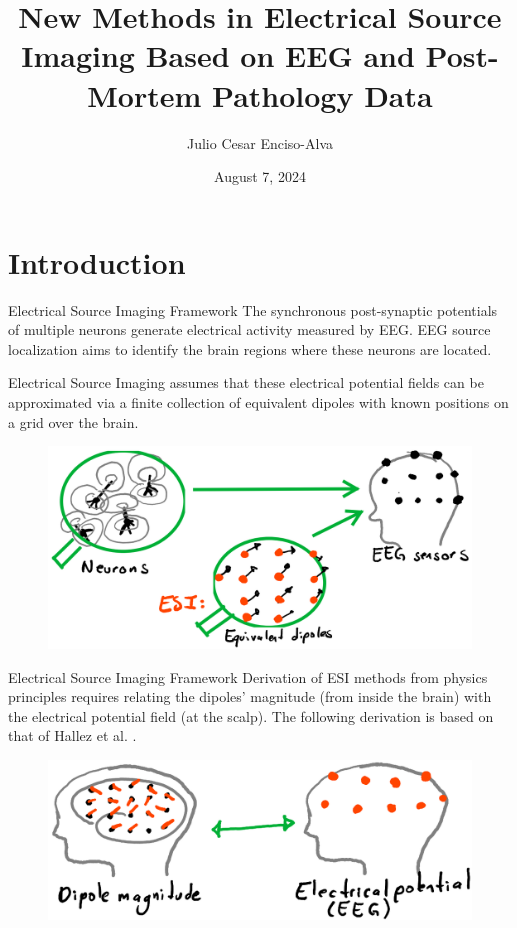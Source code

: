 \documentclass[progressbar=head]{beamer}
\title{New Methods in Electrical Source Imaging Based on EEG and Post-Mortem Pathology Data}
\date{August 7, 2024}
\author{Julio Cesar Enciso-Alva}
\institute{University   of Texas at Arlington}
\begin{document}
{
\maketitle

\begin{frame}%
\tableofcontents
\end{frame}
}

{
\section{Introduction}
}

\begin{frame}{Electrical Source Imaging Framework}
    The synchronous post-synaptic potentials of multiple neurons generate electrical activity measured by EEG.
    EEG source localization aims to identify the brain regions where these neurons are located.
    
    Electrical Source Imaging assumes that 
    these electrical potential fields
    can be 
    approximated via a finite collection 
    of equivalent dipoles
    with known positions on a grid over the brain.

\begin{figure}
\centering
\includegraphics[width=0.6\linewidth]{./img_oldbeamer/sketch03}
\end{figure}
\end{frame}

\begin{frame}{Electrical Source Imaging Framework}
Derivation of ESI methods from physics principles requires relating the \alert{dipoles' magnitude} (from inside the brain) with the \alert{electrical potential field} (at the scalp).
The following derivation is based on 
that of Hallez et al.
\cite{hallez2007review}.

\begin{figure}
\centering
\includegraphics[width=0.75\linewidth]{./img_oldbeamer/sketch04}
\end{figure}
\end{frame}
\end{document}
